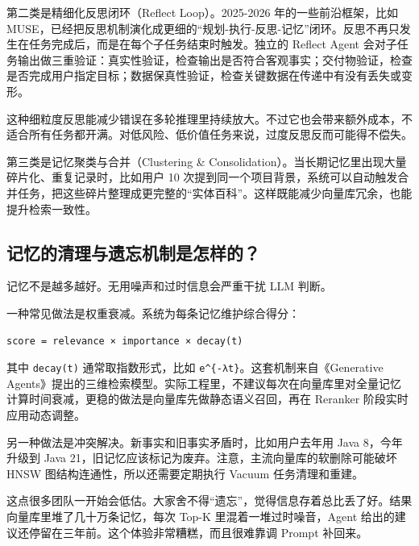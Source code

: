 \documentclass[10pt,a4paper]{ctexart}
\begin{document}
第二类是精细化反思闭环（Reflect Loop）。2025-2026 年的一些前沿框架，比如 MUSE，已经把反思机制演化成更细的“规划-执行-反思-记忆”闭环。反思不再只发生在任务完成后，而是在每个子任务结束时触发。独立的 Reflect Agent 会对子任务输出做三重验证：真实性验证，检查输出是否符合客观事实；交付物验证，检查是否完成用户指定目标；数据保真性验证，检查关键数据在传递中有没有丢失或变形。



这种细粒度反思能减少错误在多轮推理里持续放大。不过它也会带来额外成本，不适合所有任务都开满。对低风险、低价值任务来说，过度反思反而可能得不偿失。



第三类是记忆聚类与合并（Clustering \& Consolidation）。当长期记忆里出现大量碎片化、重复记录时，比如用户 10 次提到同一个项目背景，系统可以自动触发合并任务，把这些碎片整理成更完整的“实体百科”。这样既能减少向量库冗余，也能提升检索一致性。



\subsection{记忆的清理与遗忘机制是怎样的？}


记忆不是越多越好。无用噪声和过时信息会严重干扰 LLM 判断。



一种常见做法是权重衰减。系统为每条记忆维护综合得分：



\begin{lstlisting}
score = relevance × importance × decay(t)
\end{lstlisting}



其中 \texttt{decay(t)} 通常取指数形式，比如 \texttt{e\textasciicircum{}\{-λt\}}。这套机制来自《Generative Agents》提出的三维检索模型。实际工程里，不建议每次在向量库里对全量记忆计算时间衰减，更稳的做法是向量库先做静态语义召回，再在 Reranker 阶段实时应用动态调整。



另一种做法是冲突解决。新事实和旧事实矛盾时，比如用户去年用 Java 8，今年升级到 Java 21，旧记忆应该标记为废弃。注意，主流向量库的软删除可能破坏 HNSW 图结构连通性，所以还需要定期执行 Vacuum 任务清理和重建。



这点很多团队一开始会低估。大家舍不得“遗忘”，觉得信息存着总比丢了好。结果向量库里堆了几十万条记忆，每次 Top-K 里混着一堆过时噪音，Agent 给出的建议还停留在三年前。这个体验非常糟糕，而且很难靠调 Prompt 补回来。
\end{document}
